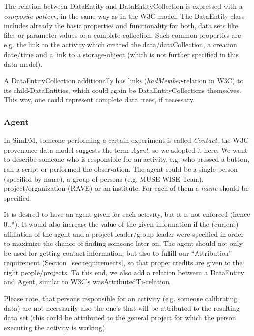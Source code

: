 The relation between DataEntity and DataEntityCollection is expressed with a \emph{composite pattern}, 
in the same way as in the W3C model. The DataEntity class includes already the basic properties and functionality for both, data sets like files or 
parameter values or a complete collection. Such common properties are e.g. the link 
to the activity which created the data/dataCollection, a creation date/time and a link to a
storage-object (which is not further specified in this data model).

A DataEntityCollection additionally has links (\emph{hadMember}-relation in W3C) to its 
child-DataEntities, which could again be DataEntityCollections themselves.
This way, one could represent complete data trees, if necessary.



\subsubsection{Agent}
In SimDM, someone performing a certain experiment is called \emph{Contact}, 
the W3C provenance data model suggests the term \emph{Agent}, so we adopted it here.
We want to describe someone who is responsible for an activity, e.g. who pressed a button, 
ran a script or performed the observation. The agent could be a single person 
(specified by name), a group of persons (e.g. MUSE WISE Team), project/organization (RAVE) or an institute. 
For each of them a \emph{name} should be specified.

It is desired to have an agent given for each activity, but it
is not enforced (hence 0..*).  It would also increase the value of the given
information if the (current) affiliation of the agent and a project leader/group
leader were specified in order to maximize the chance of finding someone later
on. The agent should not only be used for getting contact information, but also 
to fulfill our ``Attribution'' requirement (Section~\ref{sec:requirements}, 
so that proper credits are given to the right 
people/projects. To this end, we also add a 
relation between a DataEntity and Agent, similar to W3C's 
wasAttributedTo-relation.

Please note, that persons responsible for an activity (e.g. someone calibrating data) are not necessarily also the one's that will be attributed to the resulting data set (this could 
be attributed to the general project for which the person executing the activity is working).

